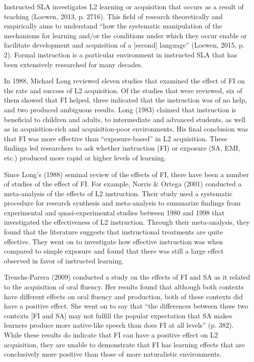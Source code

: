 \begin{styleStandard}
Instructed SLA investigates L2 learning or acquisition that occurs as a result of teaching (Loewen, 2013, p. 2716). This field of research theoretically and empirically aims to understand “how the systematic manipulation of the mechanisms for learning and/or the conditions under which they occur enable or facilitate development and acquisition of a [second] language” (Loewen, 2015, p. 2). Formal instruction is a particular environment in instructed SLA that has been extensively researched for many decades. 
\end{styleStandard}

\begin{styleStandard}
In 1988, Michael Long reviewed eleven studies that examined the effect of FI on the rate and success of L2 acquisition. Of the studies that were reviewed, six of them showed that FI helped, three indicated that the instruction was of no help, and two produced ambiguous results. Long (1983) claimed that instruction is beneficial to children and adults, to intermediate and advanced students, as well as in acquisition-rich and acquisition-poor environments. His final conclusion was that FI was more effective than “exposure-based” in L2 acquisition. These findings led researchers to ask whether instruction (FI) or exposure (SA, EMI, etc.) produced more rapid or higher levels of learning. 
\end{styleStandard}

\begin{styleStandard}
Since Long’s (1988) seminal review of the effects of FI, there have been a number of studies of the effect of FI. For example, Norris \& Ortega (2001) conducted a meta-analysis of the effects of L2 instruction. Their study used a systematic procedure for research synthesis and meta-analysis to summarize findings from experimental and quasi-experimental studies between 1980 and 1998 that investigated the effectiveness of L2 instruction. Through their meta-analysis, they found that the literature suggests that instructional treatments are quite effective. They went on to investigate how effective instruction was when compared to simple exposure and found that there was still a large effect observed in favor of instructed learning.
\end{styleStandard}

\begin{styleStandard}
Trenchs-Parera (2009) conducted a study on the effects of FI and SA as it related to the acquisition of oral fluency. Her results found that although both contexts have different effects on oral fluency and production, both of these contexts did have a positive effect. She went on to say that “the differences between these two contexts [FI and SA] may not fulfill the popular expectation that SA makes learners produce more native-like speech than does FI at all levels” (p. 382). While these results do indicate that FI can have a positive effect on L2 acquisition, they are unable to demonstrate that FI has learning effects that are conclusively more positive than those of more naturalistic environments.
\end{styleStandard}

